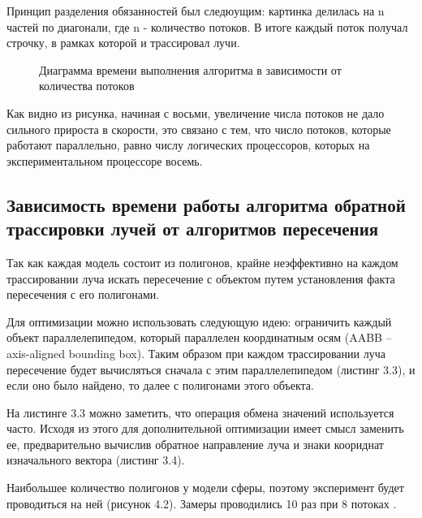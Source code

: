 \documentclass[12pt,a4paper,oneside]{report}
\begin{document}
	 Принцип разделения обязанностей был следюущим: картинка делилась на n частей по диагонали, где n - количество потоков. В итоге каждый поток получал строчку, в рамках которой и трассировал лучи.
	
	\begin{figure}[h]
		\centering
		\caption{Диаграмма времени выполнения алгоритма в зависимости от количества потоков}
	\end{figure}
	
	 Как видно из рисунка, начиная с восьми, увеличение числа потоков не дало сильного прироста в скорости, это связано с тем, что число потоков, которые  работают параллельно, равно числу логических процессоров, которых на экспериментальном процессоре восемь.
	
	\subsection{Зависимость времени работы алгоритма обратной трассировки лучей от алгоритмов пересечения}
	
	 \quad Так как каждая модель состоит из полигонов, крайне неэффективно на каждом трассировании луча искать пересечение с объектом путем установления факта пересечения с его полигонами.
	
	 Для оптимизации можно использовать следующую идею: ограничить каждый объект параллелепипедом, который параллелен координатным осям (AABB -- axis-aligned bounding box). Таким образом при каждом трассировании луча пересечение будет вычисляться сначала с этим параллелепипедом (листинг 3.3), и если оно было найдено, то далее с полигонами этого объекта. 
	
	 На листинге 3.3 можно заметить, что операция обмена значений используется часто. Исходя из этого для дополнительной оптимизации имеет смысл заменить ее, предварительно вычислив обратное направление луча и знаки коориднат изначального вектора (листинг 3.4).
	
	 Наибольшее количество полигонов у модели сферы, поэтому эксперимент будет проводиться на ней (рисунок 4.2). Замеры проводились 10 раз при 8 потоках .
	
\end{document}
